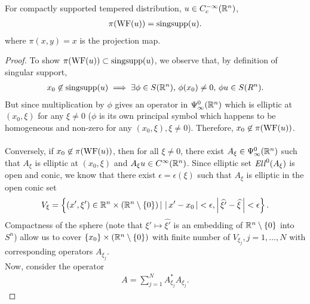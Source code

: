 \documentclass{article}
\begin{document}
\begin{fprop}
    For compactly supported tempered distribution, $u \in C^{-\infty}_c({\mathbb R}^n)$, 
    \begin{align*}
    \pi(\mathrm{WF}(u)) = \mathrm{singsupp}(u). 
    \end{align*}
    where $\pi(x, y) = x$ is the projection map. 
\end{fprop}
\begin{proof}
    To show $\pi(\mathrm{WF}(u)) \subset \mathrm{singsupp}(u)$, we observe that, by definition of singular support, 
    \begin{align*}
    x_0 \not \in \mathrm{singsupp}(u) \implies \exists \phi \in S({\mathbb R}^n), \, \phi(x_0) \neq 0, \, \phi u \in S(R^n). 
    \end{align*}
    But since multiplication by $\phi$ gives an operator in $\Psi^0_\infty({\mathbb R}^n)$ which is elliptic at $(x_0, \xi)$ for any $\xi \neq 0$ ($\phi$ is its own principal symbol which happens to be homogeneous and non-zero for any $(x_0, \xi), \xi \neq 0$). Therefore, $x_0 \not \in \pi(\mathrm{WF}(u))$. \\
    \\
    Conversely, if $x_0 \not\in \pi(\mathrm{WF}(u))$, then for all $\xi \neq 0$, there exist $A_\xi \in \Psi^0_\infty({\mathbb R}^n)$ such that $A_\xi$ is elliptic at $(x_0, \xi)$ and $A_\xi u \in C^\infty({\mathbb R}^n)$. Since elliptic set $\mathit{Ell}^0(A_\xi)$ is open and conic, we know that there exist $\epsilon = \epsilon(\xi)$ such that $A_\xi$ is elliptic in the open conic set
    \begin{align*}
    V_\xi = \left\{(x', \xi')\in {\ensuremath {\mathbb R}}^n \times ({\mathbb R}^n \setminus \left\{0\right\}) \, | \, \left|\, x' - x_0\,\right| < \epsilon, \left|\, \widehat{\xi'} - \widehat{\xi}\,\right| < \epsilon \right\}. 
    \end{align*}
    Compactness of the sphere (note that $\xi' \mapsto \widehat{\xi'}$ is an embedding of ${\mathbb R}^n \setminus \left\{0\right\}$ into $S^n$) allow us to cover $\left\{x_0\right\} \times ({\mathbb R}^n \setminus \left\{0\right\})$ with finite number of $V_{\xi_j}, j = 1, \dots, N$ with corresponding operators $A_{\xi_j}$. \\
    Now, consider the operator
    \begin{align*}
    A = \sum_{j = 1}^N A^*_{\xi_j}A_{\xi_j}. 
    \end{align*}
    
    
\end{proof}
\end{document}
